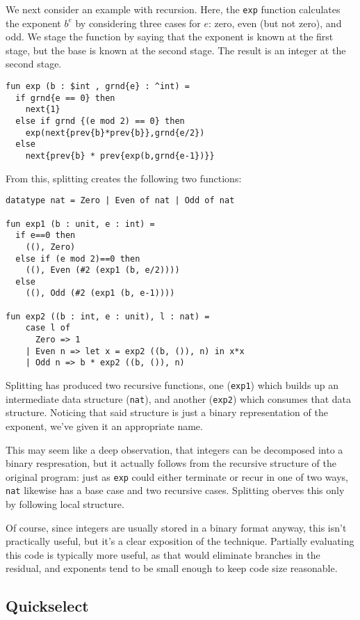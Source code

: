 We next consider an example with recursion.
Here, the \texttt{exp} function calculates the exponent $b^e$
by considering three cases for $e$: zero, even (but not zero), and odd.
We stage the function by saying that the exponent is known at the first stage,
but the base is known at the second stage.
The result is an integer at the second stage.
\begin{lstlisting} 
fun exp (b : $int , grnd{e} : ^int) = 
  if grnd{e == 0} then 
    next{1} 
  else if grnd {(e mod 2) == 0} then
    exp(next{prev{b}*prev{b}},grnd{e/2})
  else 
    next{prev{b} * prev{exp(b,grnd{e-1})}}
\end{lstlisting}
\noindent
From this, splitting creates the following two functions:
\begin{lstlisting} 
datatype nat = Zero | Even of nat | Odd of nat

fun exp1 (b : unit, e : int) =
  if e==0 then
    ((), Zero)
  else if (e mod 2)==0 then 
    ((), Even (#2 (exp1 (b, e/2))))
  else 
    ((), Odd (#2 (exp1 (b, e-1))))

fun exp2 ((b : int, e : unit), l : nat) = 
    case l of
      Zero => 1
    | Even n => let x = exp2 ((b, ()), n) in x*x 
    | Odd n => b * exp2 ((b, ()), n)
\end{lstlisting}
Splitting has produced two recursive functions,
one (\texttt{exp1}) which builds up an intermediate data structure (\texttt{nat}),
and another (\texttt{exp2}) which consumes that data structure.  
Noticing that said structure is just a binary representation of the exponent,
we've given it an appropriate name.

This may seem like a deep observation, 
that integers can be decomposed into a binary respresation,
but it actually follows from the recursive structure of the original program:
just as \texttt{exp} could either terminate or recur in one of two ways,
\texttt{nat} likewise has a base case and two recursive cases.
Splitting oberves this only by following local structure.

Of course, since integers are usually stored in a binary format anyway, 
this isn't practically useful, but it's a clear exposition of the technique.
Partially evaluating this code is typically more useful,
as that would eliminate branches in the residual,
and exponents tend to be small enough to keep code size reasonable.

\subsection{Quickselect}

